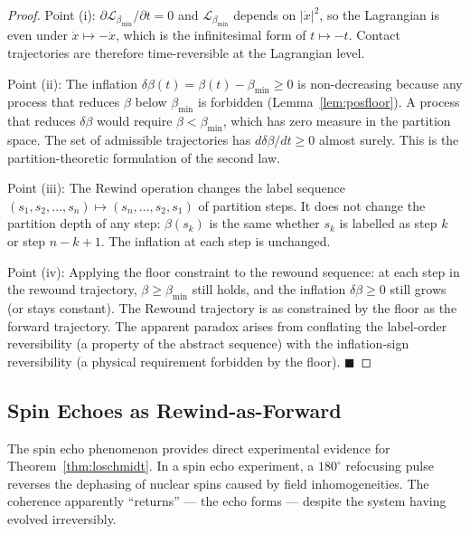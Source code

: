 \documentclass[12pt, a4paper]{article}
\theoremstyle{plain}
\theoremstyle{definition}
\theoremstyle{remark}
\newcommand{\bmin}{\beta_{\min}}
\newcommand{\Lmin}{\mathcal{L}_{\bmin}}
\newcommand{\qed}{\hfill$\blacksquare$}
\begin{document}
\begin{proof}
Point (i): $\partial\Lmin/\partial t = 0$ and $\Lmin$ depends on $|\dot{x}|^2$,
so the Lagrangian is even under $\dot{x} \mapsto -\dot{x}$, which is the
infinitesimal form of $t \mapsto -t$. Contact trajectories are therefore
time-reversible at the Lagrangian level.

Point (ii): The inflation $\delta\beta(t) = \beta(t) - \bmin \geq 0$ is
non-decreasing because any process that reduces $\beta$ below $\bmin$ is
forbidden (Lemma~\ref{lem:posfloor}). A process that reduces $\delta\beta$
would require $\beta < \bmin$, which has zero measure in the partition space.
The set of admissible trajectories has $d\delta\beta/dt \geq 0$ almost surely.
This is the partition-theoretic formulation of the second law.

Point (iii): The Rewind operation changes the label sequence $(s_1, s_2, \ldots,
s_n) \mapsto (s_n, \ldots, s_2, s_1)$ of partition steps. It does not change
the partition depth of any step: $\beta(s_k)$ is the same whether $s_k$ is
labelled as step $k$ or step $n-k+1$. The inflation at each step is unchanged.

Point (iv): Applying the floor constraint to the rewound sequence: at each step
in the rewound trajectory, $\beta \geq \bmin$ still holds, and the inflation
$\delta\beta \geq 0$ still grows (or stays constant). The Rewound trajectory
is as constrained by the floor as the forward trajectory. The apparent paradox
arises from conflating the label-order reversibility (a property of the abstract
sequence) with the inflation-sign reversibility (a physical requirement forbidden
by the floor). \qed
\end{proof}

\subsection{Spin Echoes as Rewind-as-Forward}

The spin echo phenomenon \citep{hahn1950,carr1954} provides direct experimental
evidence for Theorem~\ref{thm:loschmidt}. In a spin echo experiment, a $180^\circ$
refocusing pulse reverses the dephasing of nuclear spins caused by field
inhomogeneities. The coherence apparently ``returns'' --- the echo forms ---
despite the system having evolved irreversibly.
\end{document}
